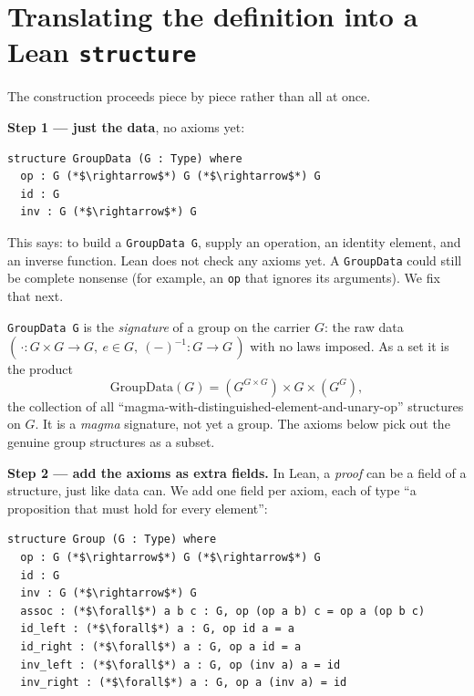 \section{\texorpdfstring{Translating the definition into a Lean \texttt{structure}}{Translating the definition into a Lean structure}}\label{sec:06-groups:02-translating:1}

The construction proceeds piece by piece rather than all at once.

\textbf{Step 1 --- just the data}, no axioms yet:

\begin{lstlisting}
structure GroupData (G : Type) where
  op : G (*$\rightarrow$*) G (*$\rightarrow$*) G
  id : G
  inv : G (*$\rightarrow$*) G
\end{lstlisting}

This says: to build a \texttt{GroupData G}, supply an operation, an identity element, and an inverse function. Lean does not check any axioms yet. A \texttt{GroupData} could still be complete nonsense (for example, an \texttt{op} that ignores its arguments). We fix that next.

\begin{mathreading}

\texttt{GroupData G} is the \emph{signature} of a group on the carrier \(G\): the raw data \((\,\cdot : G\times G \to G,\ e \in G,\ (-)^{-1}
: G \to G\,)\) with no laws imposed. As a set it is the product \[
\mathrm{GroupData}(G) = (G^{G\times G}) \times G \times (G^{G}),
\] the collection of all ``magma-with-distinguished-element-and-unary-op'' structures on \(G\). It is a \emph{magma} signature, not yet a group. The axioms below pick out the genuine group structures as a subset.

\end{mathreading}

\textbf{Step 2 --- add the axioms as extra fields.} In Lean, a \emph{proof} can be a field of a structure, just like data can. We add one field per axiom, each of type ``a proposition that must hold for every element'':

\begin{lstlisting}
structure Group (G : Type) where
  op : G (*$\rightarrow$*) G (*$\rightarrow$*) G
  id : G
  inv : G (*$\rightarrow$*) G
  assoc : (*$\forall$*) a b c : G, op (op a b) c = op a (op b c)
  id_left : (*$\forall$*) a : G, op id a = a
  id_right : (*$\forall$*) a : G, op a id = a
  inv_left : (*$\forall$*) a : G, op (inv a) a = id
  inv_right : (*$\forall$*) a : G, op a (inv a) = id
\end{lstlisting}

